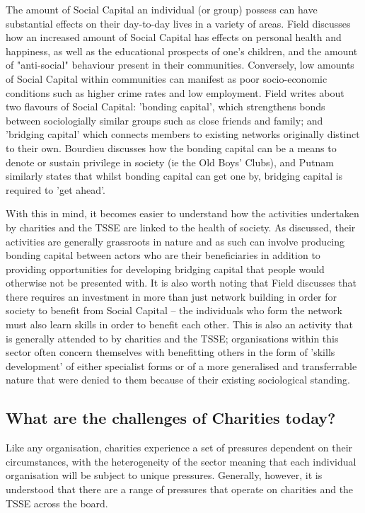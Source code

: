 The amount of Social Capital an individual (or group) possess can have substantial effects on their day-to-day lives in a variety of areas. Field discusses how an increased amount of Social Capital has effects on personal health and happiness, as well as the educational prospects of one's children, and the amount of "anti-social" behaviour present in their communities. Conversely, low amounts of Social Capital within communities can manifest as poor socio-economic conditions such as higher crime rates and low employment. Field writes about two flavours of Social Capital: 'bonding capital', which strengthens bonds between sociologially similar groups such as close friends and family; and 'bridging capital' which connects members to existing networks originally distinct to their own. Bourdieu discusses how the bonding capital can be a means to denote or sustain privilege in society (ie the Old Boys' Clubs), and Putnam similarly states that whilst bonding capital can get one by, bridging capital is required to 'get ahead'.

With this in mind, it becomes easier to understand how the activities undertaken by charities and the TSSE are linked to the health of society. As discussed, their activities are generally grassroots in nature and as such can involve producing bonding capital between actors who are their beneficiaries in addition to providing opportunities for developing bridging capital that people would otherwise not be presented with. It is also worth noting that Field discusses that there requires an investment in more than just network building in order for society to benefit from Social Capital -- the individuals who form the network must also learn skills in order to benefit each other. This is also an activity that is generally attended to by charities and the TSSE; organisations within this sector often concern themselves with benefitting others in the form of 'skills development' of either specialist forms or of a more generalised and transferrable nature that were denied to them because of their existing sociological standing.

\subsection{What are the challenges of Charities today?}
Like any organisation, charities experience a set of pressures dependent on their circumstances, with the heterogeneity of the sector meaning that each individual organisation will be subject to unique pressures. Generally, however, it is understood that there are a range of pressures that operate on charities and the TSSE across the board.


